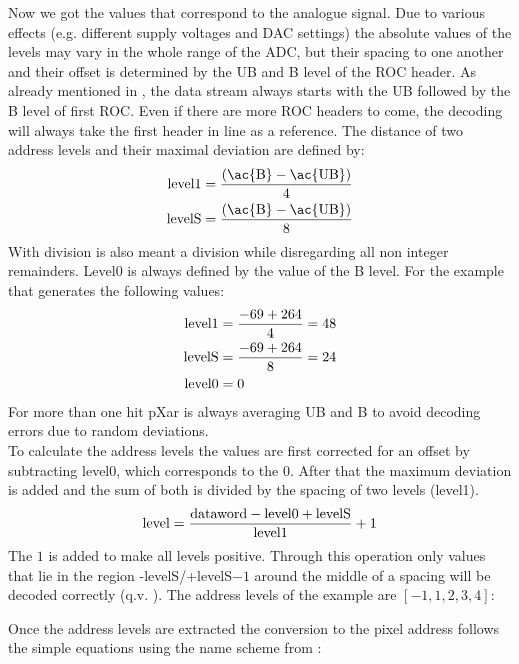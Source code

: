 \documentclass[british,11pt,a4paper]{memoir}
\begin{document}
Now we got the values that correspond to the analogue signal. Due to various effects (e.g. different supply voltages and \ac{DAC} settings) the absolute values of the levels may vary in the whole range of the \ac{ADC}, but their spacing to one another and their offset is determined by the \ac{UB} and \ac{B} level of the \ac{ROC} header. As already mentioned in , the data stream always starts with the \ac{UB} followed by the \ac{B} level of first \ac{ROC}. Even if there are more \ac{ROC} headers to come, the decoding will always take the first header in line as a reference. The distance of two address levels and their maximal deviation are defined by:
\begin{align}
	\z{level}1 &= \frac{\left( \z{\ac{B}} - \z{\ac{UB}} \right)}{4}\\
	\z{levelS} &= \frac{\left( \z{\ac{B}} - \z{\ac{UB}} \right)}{8}
\end{align}
With division is also meant a division while disregarding all non integer remainders. Level$0$ is always defined by the value of the \ac{B} level. For the example that generates the following values:
\begin{align*}
	\text{level}1 &= \frac{-69+264}{4} = 48\\
	\text{levelS} &= \frac{-69+264}{8} = 24\\
	\text{level}0 &= 0
\end{align*}
For more than one hit pXar is always averaging \ac{UB} and \ac{B} to avoid decoding errors due to random deviations.\\
To calculate the address levels the values are first corrected for an offset by subtracting level$0$, which corresponds to the $0$. After that the maximum deviation is added and the sum of both is divided by the spacing of two levels (level1).
\begin{equation}
	\text{level} = \frac{\text{dataword} - \text{level}0 + \text{levelS}}{\text{level}1} + 1
\end{equation}
The $1$ is added to make all levels positive. Through this operation only values that lie in the region -levelS/+levelS$-1$ around the middle of a spacing will be decoded correctly (q.v. ). The address levels of the example are $[-1, 1, 2, 3, 4]$:
\begin{center}
\terminal{[-264, -69, 29, -1, 1, 2, 3, 4, 43]}                                                    
\end{center}
Once the address levels are extracted the conversion to the pixel address follows the simple equations using the name scheme from :
\end{document}
